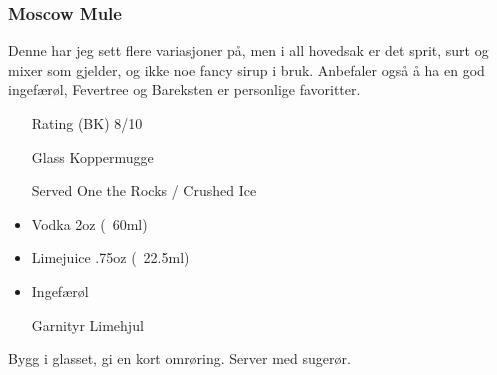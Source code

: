 \subsubsection{Moscow Mule}
Denne har jeg sett flere variasjoner på, men i all hovedsak er det sprit, surt og mixer som gjelder, og ikke noe fancy sirup i bruk. Anbefaler også å ha en god ingefærøl, Fevertree og Bareksten er personlige favoritter.
\begin{itemize}
    \item[Rating (BK)] 8/10
    \item[Glass] Koppermugge
    \item[Served] One the Rocks / Crushed Ice
    \item Vodka 2oz (~60ml)
    \item Limejuice .75oz (~22.5ml)
    \item Ingefærøl
    \item[Garnityr] Limehjul
\end{itemize}
Bygg i glasset, gi en kort omrøring. Server med sugerør.